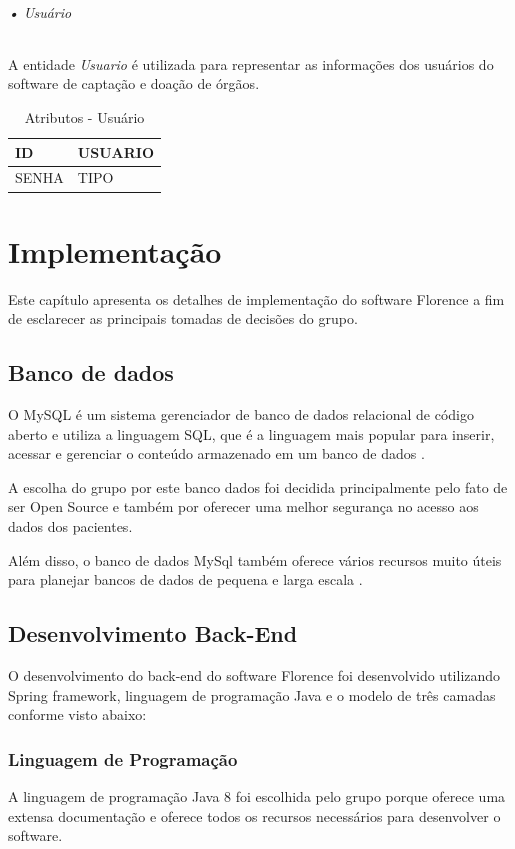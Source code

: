 \documentclass[portuguese,oneside]{tcc}
\begin{document}
\subparagraph{• Usuário}
A entidade \textit{Usuario} é utilizada para representar as informações dos usuários do software de captação e doação de órgãos. 

\begin{table}
\centering
\caption{Atributos - Usuário} \label{table:atr-usuario}
\begin{tabular}{ |p{6cm}|p{6cm}| }

\hline
ID & USUARIO\\
\hline
SENHA & TIPO\\
\hline

\end{tabular}
\end{table}


\chapter{Implementação}
Este capítulo apresenta os detalhes de implementação do software Florence a fim de esclarecer as principais tomadas de decisões do  grupo.

\section{Banco de dados}
O MySQL é um sistema gerenciador de banco de dados relacional de código aberto e utiliza a linguagem SQL, que é a linguagem mais popular para inserir, acessar e gerenciar o conteúdo armazenado em um banco de dados \cite{MYSQLV}.

A escolha do grupo por este banco dados foi decidida principalmente pelo fato de ser Open Source e também por oferecer uma melhor segurança no acesso aos dados dos pacientes. 

Além disso, o banco de dados MySql também oferece vários recursos muito úteis para planejar bancos de dados de pequena e larga escala \cite{PLANBANCODEDADO}. %

\section{Desenvolvimento Back-End}
O desenvolvimento do back-end do software Florence foi desenvolvido utilizando Spring framework, linguagem de programação Java e o modelo de três camadas conforme visto abaixo:

\subsection{Linguagem de Programação}
A linguagem de programação Java 8 foi escolhida pelo grupo porque oferece uma extensa documentação e oferece todos os recursos necessários para desenvolver o software.
\end{document}
